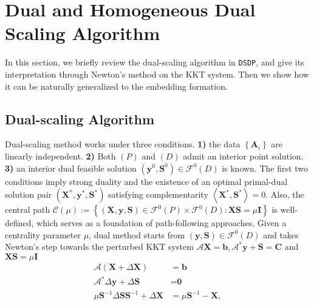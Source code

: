 \section{Dual and Homogeneous Dual Scaling Algorithm }\label{sec3}

In this section, we briefly review the dual-scaling algorithm in
{{\texttt{DSDP}}}, and give its interpretation through Newton's method on the KKT system. Then we show how it can be naturally generalized to the embedding formation.
\subsection{Dual-scaling Algorithm}
Dual-scaling method
{\cite{benson1999mixed}} works under three conditions. {\textbf{1)}} the
 data $\left\{ \mathbf{A}_i \right\}$ are linearly independent.
{\textbf{2)}} Both $(P)$ and $(D)$ admit an interior point
solution. {\textbf{3)}} an interior dual feasible solution $\left( \mathbf{y}^0,
\mathbf{S}^0 \right) \in \mathcal{F}^0 (D)$ is known. The first two conditions imply
strong duality and the existence of an optimal primal-dual solution pair $\left(
\mathbf{X}^{\ast}, \mathbf{y}^{\ast}, \mathbf{S}^{\ast} \right)$ satisfying complementarity
$\left\langle \mathbf{X}^{\ast}, \mathbf{S}^{\ast} \right\rangle = 0$. Also, the central path $\mathcal{C} (\mu) :=
\left\{ \left( \mathbf{X}, \mathbf{y}, \mathbf{S} \right) \in \mathcal{F}^0 (P) \times \mathcal{F}^0
(D) : \mathbf{X} \mathbf{S} = \mu \mathbf{I} \right\}$ is well-defined, which serves as a foundation of
path-following approaches. Given a centrality parameter $\mu$, 
dual method starts from
$\left( \mathbf{y}, \mathbf{S} \right) \in \mathcal{F}^0(D)$ and takes Newton's step towards the perturbed KKT system $\mathcal{A} \mathbf{X} = \mathbf{b},
\mathcal{A}^{\ast} \mathbf{y} + \mathbf{S} = \mathbf{C}$ and $\mathbf{X} \mathbf{S} = \mu \mathbf{I}$
\begin{align}\label{dsdpnewton}
  \mathcal{A} \left( \mathbf{X} + \Delta \mathbf{X} \right) & = \mathbf{b} \nonumber \\
  \mathcal{A}^{\ast} \Delta \mathbf{y} + \Delta \mathbf{S} & = \textbf{0} \\
  \mu \mathbf{S}^{- 1} \Delta \mathbf{S} \mathbf{S}^{- 1} + \Delta \mathbf{X} & = \mu \mathbf{S}^{- 1} - \mathbf{X} \nonumber, 
\end{align}

